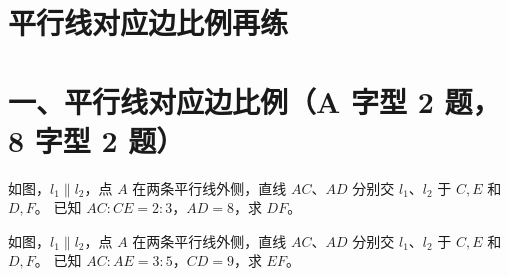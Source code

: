 \documentclass{exam-zh}
\begin{document}
\section*{平行线对应边比例再练}

\section*{一、平行线对应边比例（A 字型 2 题，8 字型 2 题）}


\begin{problem}[points=8]
  \noindent
  \begin{minipage}[t]{\dimexpr\linewidth-60mm-6mm\relax}
    \vspace{0pt}
    如图，$l_1\parallel l_2$，点 $A$ 在两条平行线外侧，直线 $AC$、$AD$ 分别交 $l_1$、$l_2$ 于 $C,E$ 和 $D,F$。
已知 $AC:CE=2:3$，$AD=8$，求 $DF$。


  \end{minipage}\hfill
  \begin{diagramcoltikz}{60mm}{第 1 题图}
  }
  \end{diagramcoltikz}
  \par\medskip
  \answerarea[35mm]
\end{problem}



\begin{problem}[points=8]
  \noindent
  \begin{minipage}[t]{\dimexpr\linewidth-60mm-6mm\relax}
    \vspace{0pt}
    如图，$l_1\parallel l_2$，点 $A$ 在两条平行线外侧，直线 $AC$、$AD$ 分别交 $l_1$、$l_2$ 于 $C,E$ 和 $D,F$。
已知 $AC:AE=3:5$，$CD=9$，求 $EF$。


  \end{minipage}\hfill
  \begin{diagramcoltikz}{60mm}{第 2 题图}
  }
  \end{diagramcoltikz}
  \par\medskip
  \answerarea[35mm]
\end{problem}


\end{document}
